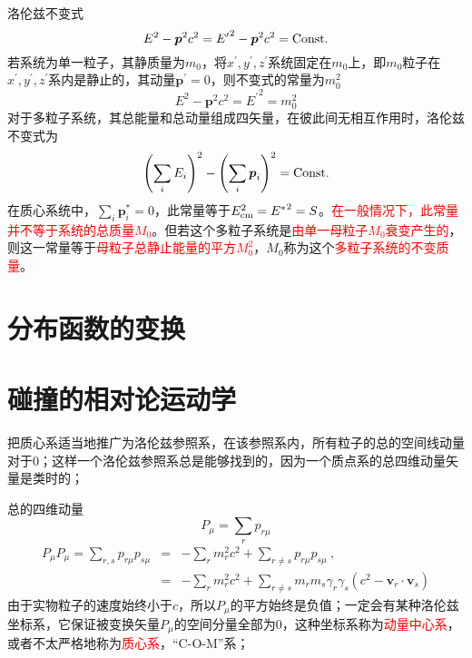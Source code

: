 \documentclass[11pt,a4paper]{article}
\renewcommand{\vec}[1]{\boldsymbol{#1}}
\begin{document}
洛伦兹不变式
\begin{equation}
E^2 -\vec{p}^2 c^2 = {E^{\prime}}^2 -\vec{p}^2 c^2 = {\rm Const.}
\end{equation}
若系统为单一粒子，其静质量为$m_0$，将$x^{\prime}, y^{\prime}, z^{\prime}$系统固定在$m_0$上，即$m_0$粒子在$x^{\prime}, y^{\prime}, z^{\prime}$系内是静止的，其动量$\vec{p}^{\prime} = 0$，则不变式的常量为$m_0^2$
\begin{equation}
E^2 -\vec{p}^2 c^2 = {E^{\prime}}^2 = m_0^2
\end{equation}
对于多粒子系统，其总能量和总动量组成四矢量，在彼此间无相互作用时，洛伦兹不变式为
\begin{eqnarray}
\left(\sum_i E_i  \right)^2 -\left(\sum_i \vec{p}_i  \right)^2 = {\rm Const.}
\end{eqnarray}
在质心系统中，$\sum_i \vec{p}_i^* = 0$，此常量等于$E_{\rm cm}^2 = {E^*}^2 = S$。\textcolor{red}{在一般情况下，此常量并不等于系统的总质量$M_0$}。但若这个多粒子系统是\textcolor{red}{由单一母粒子$M_0$衰变产生的}，则这一常量等于\textcolor{red}{母粒子总静止能量的平方$M_0^2$}，$M_0$称为这个\textcolor{red}{多粒子系统的不变质量}。


\section{分布函数的变换}


\section{碰撞的相对论运动学}
把质心系适当地推广为洛伦兹参照系，在该参照系内，所有粒子的总的空间线动量对于$0$；这样一个洛伦兹参照系总是能够找到的，因为一个质点系的总四维动量矢量是类时的；

总的四维动量
\begin{equation}
P_{\mu} = \sum_r p_{r\mu}
\end{equation}
\begin{eqnarray}
\nonumber P_{\mu} P_{\mu} = \sum_{r,s} p_{r\mu} p_{s\mu} &=& -\sum_{r} m_r^2 c^2 + \sum_{r \neq s} p_{r\mu} p_{s\mu} ~, \\
&=& -\sum_{r} m_r^2 c^2 + \sum_{r \neq s} m_r m_s \gamma_r \gamma_s (c^2 -\vec{v}_r \cdot \vec{v}_s)
\end{eqnarray}
由于实物粒子的速度始终小于$c$，所以$P_{\mu}$的平方始终是负值；一定会有某种洛伦兹坐标系，它保证被变换矢量$P_{\mu}$的空间分量全部为$0$，这种坐标系称为\textcolor{red}{动量中心系}，或者不太严格地称为\textcolor{red}{质心系}，“C-O-M”系；
\end{document}
